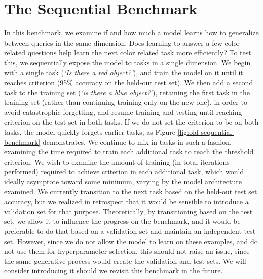 \section{The Sequential Benchmark}
In this benchmark, we examine if and how much a model learns how to generalize between queries in the same dimension. Does learning to answer a few color-related questions help learn the next color related task more efficiently? To test this, we sequentially expose the model to tasks in a single dimension. We begin with a single task (\textit{`Is there a red object?'}), and train the model on it until it reaches criterion (95\% accuracy on the held-out test set). We then add a second task to the training set (\textit{`is there a blue object?'}), retaining the first task in the training set (rather than continuing training only on the new one), in order to avoid catastrophic forgetting, and resume training and testing until reaching criterion on the test set in both tasks. If we do not set the criterion to be on both tasks, the model quickly forgets earlier tasks, as Figure \ref{fig:old-sequential-benchmark} demonstrates. We continue to mix in tasks in such a fashion, examining the time required to train each additional task to reach the threshold criterion. We wish to examine the amount of training (in total iterations performed) required to achieve criterion in each additional task, which would ideally asymptote toward some minimum, varying by the model architecture examined. We currently transition to the next task based on the held-out test set accuracy, but we realized in retrospect that it would be sensible to introduce a validation set for that purpose. Theoretically, by transitioning based on the test set, we allow it to influence the progress on the benchmark, and it would be preferable to do that based on a validation set and maintain an independent test set. However, since we do not allow the model to learn on these examples, and do not use them for hyperparameter selection, this should not raise an issue, since the same generative process would create the validation and test sets. We will consider introducing it should we revisit this benchmark in the future.  
